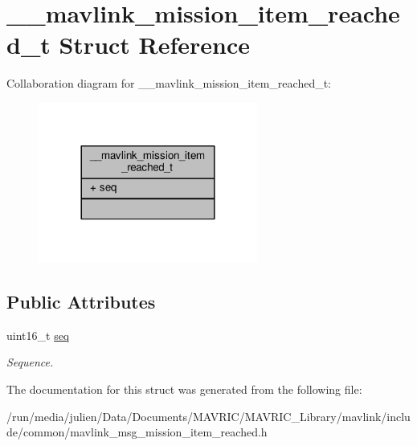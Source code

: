 \hypertarget{struct____mavlink__mission__item__reached__t}{\section{\+\_\+\+\_\+mavlink\+\_\+mission\+\_\+item\+\_\+reached\+\_\+t Struct Reference}
\label{struct____mavlink__mission__item__reached__t}
}


Collaboration diagram for \+\_\+\+\_\+mavlink\+\_\+mission\+\_\+item\+\_\+reached\+\_\+t\+:
\nopagebreak
\begin{figure}[H]
\begin{center}
\leavevmode
\includegraphics[width=204pt]{struct____mavlink__mission__item__reached__t__coll__graph}
\end{center}
\end{figure}
\subsection*{Public Attributes}
\begin{DoxyCompactItemize}
\item 
\hypertarget{struct____mavlink__mission__item__reached__t_acdab74a4633c0c3b3dfcfa75c9d2b234}{uint16\+\_\+t \hyperlink{struct____mavlink__mission__item__reached__t_acdab74a4633c0c3b3dfcfa75c9d2b234}{seq}}\label{struct____mavlink__mission__item__reached__t_acdab74a4633c0c3b3dfcfa75c9d2b234}

\begin{DoxyCompactList}\small\item\em Sequence. \end{DoxyCompactList}\end{DoxyCompactItemize}


The documentation for this struct was generated from the following file\+:\begin{DoxyCompactItemize}
\item 
/run/media/julien/\+Data/\+Documents/\+M\+A\+V\+R\+I\+C/\+M\+A\+V\+R\+I\+C\+\_\+\+Library/mavlink/include/common/mavlink\+\_\+msg\+\_\+mission\+\_\+item\+\_\+reached.\+h\end{DoxyCompactItemize}
